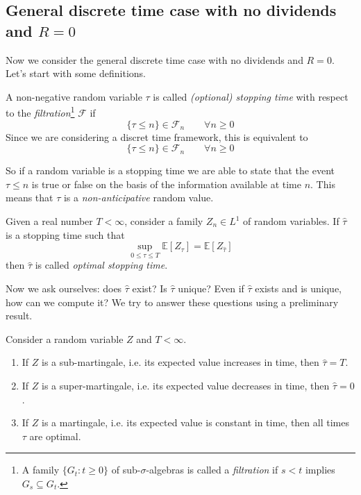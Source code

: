\subsection{General discrete time case with no dividends and \texorpdfstring{$R=0$}{R=0}}
Now we consider the general discrete time case with no dividends and $R=0$. Let's start with some definitions.
\begin{definition}
A non-negative random variable $\tau$ is called \emph{(optional) stopping time} with respect to the \emph{filtration}\footnote{A family $\{G_t:t\ge0\}$ of sub-$\sigma$-algebras is called a \emph{filtration} if $s < t$ implies $G_s \subseteq G_t$.} $\mathcal{F}$ if 
\begin{equation}
    \{\tau \le n\}\in\mathcal{F}_n \qquad\forall n\ge0
\end{equation}
Since we are considering a discret time framework, this is equivalent to
\begin{equation}
    \{\tau \le n\}\in\mathcal{F}_n \qquad\forall n\ge0
\end{equation}
\end{definition}
\noindent So if a random variable is a stopping time we are able to state that the event $\tau\le n$ is true or false on the basis of the information available at time $n$. This means that $\tau$ is a \emph{non-anticipative} random value.
\begin{definition}
Given a real number $T<\infty$, consider a family $Z_n\in L^1$ of random variables. If $\hat{\tau}$ is a stopping time such that 
\begin{equation}
    \sup_{0\le\tau\le T}\mathbb{E}[Z_{\tau}] = \mathbb{E} [Z_{\hat{\tau}}]
\end{equation}
then $\hat{\tau}$ is called \emph{optimal stopping time}.
\end{definition}
\noindent Now we ask ourselves: does $\hat{\tau}$ exist? Is $\hat{\tau}$ unique? Even if $\hat{\tau}$ exists and is unique, how can we compute it? We try to answer these questions using a preliminary result.
\begin{proposition}\label{martingales}
Consider a random variable $Z$ and $T<\infty$. 
\begin{enumerate}
    \item If $Z$ is a sub-martingale, i.e. its expected value increases in time, then $\hat{\tau}=T$.
    \item If $Z$ is a super-martingale, i.e. its expected value decreases in time, then $\hat{\tau}=0$.
    \item If $Z$ is a martingale, i.e. its expected value is constant in time, then all times $\tau$ are optimal.
\end{enumerate}
\end{proposition}
